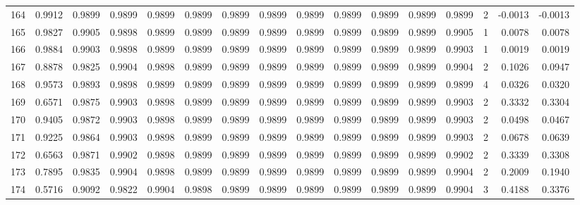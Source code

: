 \begin{tabular}{lrrrrrrrrrrrrrrr}
164 &      0.9912 &  0.9899 &  0.9899 &  0.9899 &  0.9899 &  0.9899 &  0.9899 &  0.9899 &  0.9899 &  0.9899 &   0.9899 &     0.9899 &      2 &                   -0.0013 &                    -0.0013 \\
165 &      0.9827 &  0.9905 &  0.9898 &  0.9899 &  0.9899 &  0.9899 &  0.9899 &  0.9899 &  0.9899 &  0.9899 &   0.9899 &     0.9905 &      1 &                    0.0078 &                     0.0078 \\
166 &      0.9884 &  0.9903 &  0.9898 &  0.9899 &  0.9899 &  0.9899 &  0.9899 &  0.9899 &  0.9899 &  0.9899 &   0.9899 &     0.9903 &      1 &                    0.0019 &                     0.0019 \\
167 &      0.8878 &  0.9825 &  0.9904 &  0.9898 &  0.9899 &  0.9899 &  0.9899 &  0.9899 &  0.9899 &  0.9899 &   0.9899 &     0.9904 &      2 &                    0.1026 &                     0.0947 \\
168 &      0.9573 &  0.9893 &  0.9898 &  0.9899 &  0.9899 &  0.9899 &  0.9899 &  0.9899 &  0.9899 &  0.9899 &   0.9899 &     0.9899 &      4 &                    0.0326 &                     0.0320 \\
169 &      0.6571 &  0.9875 &  0.9903 &  0.9898 &  0.9899 &  0.9899 &  0.9899 &  0.9899 &  0.9899 &  0.9899 &   0.9899 &     0.9903 &      2 &                    0.3332 &                     0.3304 \\
170 &      0.9405 &  0.9872 &  0.9903 &  0.9898 &  0.9899 &  0.9899 &  0.9899 &  0.9899 &  0.9899 &  0.9899 &   0.9899 &     0.9903 &      2 &                    0.0498 &                     0.0467 \\
171 &      0.9225 &  0.9864 &  0.9903 &  0.9898 &  0.9899 &  0.9899 &  0.9899 &  0.9899 &  0.9899 &  0.9899 &   0.9899 &     0.9903 &      2 &                    0.0678 &                     0.0639 \\
172 &      0.6563 &  0.9871 &  0.9902 &  0.9898 &  0.9899 &  0.9899 &  0.9899 &  0.9899 &  0.9899 &  0.9899 &   0.9899 &     0.9902 &      2 &                    0.3339 &                     0.3308 \\
173 &      0.7895 &  0.9835 &  0.9904 &  0.9898 &  0.9899 &  0.9899 &  0.9899 &  0.9899 &  0.9899 &  0.9899 &   0.9899 &     0.9904 &      2 &                    0.2009 &                     0.1940 \\
174 &      0.5716 &  0.9092 &  0.9822 &  0.9904 &  0.9898 &  0.9899 &  0.9899 &  0.9899 &  0.9899 &  0.9899 &   0.9899 &     0.9904 &      3 &                    0.4188 &                     0.3376 \\

\end{tabular}
